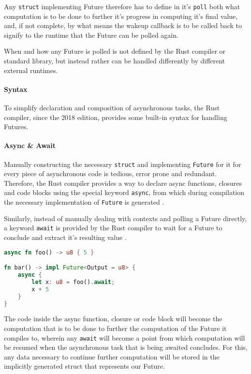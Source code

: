 \documentclass[a4paper,UKenglish,cleveref, autoref, thm-restate]{lipics-v2021}
\begin{document}
Any \verb|struct| implementing Future therefore has to define in it's \verb|poll| both what computation is to be done to further it's progress in computing it's final value, and, if not complete, by what means the wakeup callback is to be called back to signify to the runtime that the Future can be polled again.

When and how any Future is polled is not defined by the Rust compiler or standard library, but instead rather can be handled differently by different external runtimes.

\paragraph*{Syntax}

To simplify declaration and composition of asynchronous tasks, the Rust compiler, since the 2018 edition, provides some built-in syntax for handling Futures.

\paragraph*{Async \& Await}

Manually constructing the necessary \verb|struct| and implementing \verb|Future| for it for every piece of asynchronous code is tedious, error prone and redundant. Therefore, the Rust compiler provides a way to declare async functions, closures and code blocks using the special keyword \verb|async|, from which during compilation the necessary implementation of \verb|Future| is generated \cite{asyncRus3:online}.

Similarly, instead of manually dealing with contexts and polling a Future directly, a keyword \verb|await| is provided by the Rust compiler to wait for a Future to conclude and extract it's resulting value \cite{Awaitexp35:online}.

\begin{minipage}{\linewidth}
\begin{lstlisting}[language=Rust,caption={Example for async \& await},captionpos=t]
async fn foo() -> u8 { 5 }

fn bar() -> impl Future<Output = u8> {
    async {
        let x: u8 = foo().await;
        x + 5
    }
}
\end{lstlisting}
\end{minipage}

The code inside the async function, closure or code block will become the computation that is to be done to further the computation of the Future it compiles to, wherein any \verb|await| will become a point from which computation will be resumed when the asynchronous task that is being awaited concludes. For this, any data necessary to continue further computation will be stored in the implicitly generated struct that represents our Future.
\end{document}

